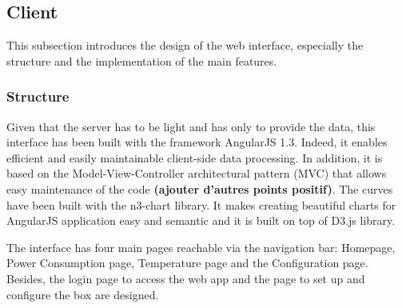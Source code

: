 \subsection{Client} %

This subsection introduces the design of the web interface, especially the structure and the implementation of the main features.

\subsubsection{Structure}
    Given that the server has to be light and has only to provide the data, this interface has been built with the framework AngularJS 1.3. Indeed, it enables efficient and easily maintainable client-side data processing. In addition, it is based on the Model-View-Controller architectural pattern (MVC) that allows easy maintenance of the code \textbf{(ajouter d'autres points positif)}. The curves have been built with the n3-chart library. It makes creating beautiful charts for AngularJS application easy and semantic and it is built on top of D3.js library.
    
    The interface has four main pages reachable via the navigation bar: Homepage, Power Consumption page, Temperature page and the Configuration page. Besides, the login page to access the web app and the page to set up and configure the box are designed.
     
    \begin{figure}[!h] 
        \centering
    \end{figure}

